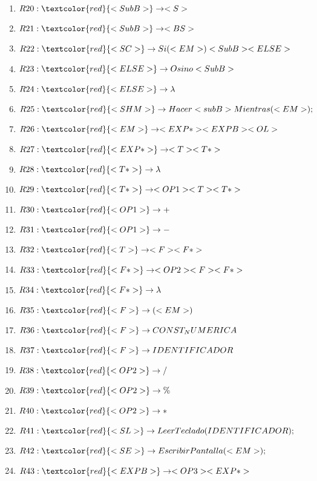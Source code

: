 \documentclass{article}
\begin{document}
\begin{enumerate}
\item $R20:   \textcolor{red}{ <SubB>}    \rightarrow   <S>$
\item $R21:   \textcolor{red}{ <SubB>   } \rightarrow   <BS>$
\item $R22:  \textcolor{red}{  <SC> }       \rightarrow   Si(<EM>)<SubB><ELSE>$
\item $R23:    \textcolor{red}{<ELSE>}    \rightarrow   Osino<SubB>$
\item $R24:    \textcolor{red}{<ELSE> }   \rightarrow   \lambda$
\item $R25:   \textcolor{red}{ <SHM> }   \rightarrow   Hacer<subB>Mientras(<EM>);$
\item $R26:    \textcolor{red}{<EM> }   \rightarrow   <EXP*><EXPB><OL>$
\item $R27:    \textcolor{red}{ <EXP*> }       \rightarrow   <T><T*>$
\item $R28:     \textcolor{red}{<T*>  }      \rightarrow   \lambda$
\item $R29:    \textcolor{red}{<T*>}        \rightarrow   <OP1><T><T*>$
\item $R30:    \textcolor{red}{ <OP1>  }      \rightarrow   + $
\item $R31:     \textcolor{red}{<OP1>   }     \rightarrow   - $
\item $R32:    \textcolor{red}{ <T>}        \rightarrow   <F><F*> $
\item $R33:     \textcolor{red}{<F*>}        \rightarrow   <OP2><F><F*> $
\item $R34:     \textcolor{red}{<F*> }       \rightarrow   \lambda $
\item $R35:     \textcolor{red}{<F>}        \rightarrow   (<EM>)  $ 
\item $R36:     \textcolor{red}{<F> }       \rightarrow   CONST_NUMERICA $ 
\item $R37:     \textcolor{red}{<F>    }    \rightarrow   IDENTIFICADOR $
\item $R38:     \textcolor{red}{<OP2>}        \rightarrow   / $
\item $R39:     \textcolor{red}{<OP2> }       \rightarrow   \% $
\item $R40:     \textcolor{red}{<OP2> }       \rightarrow   * $
\item $R41:    \textcolor{red}{ <SL>   }   \rightarrow   LeerTeclado(IDENTIFICADOR);$
\item $R42:     \textcolor{red}{<SE>}        \rightarrow   EscribirPantalla(<EM>); $
\item $R43:     \textcolor{red}{<EXPB>}        \rightarrow   <OP3><EXP*> $

\end{enumerate}
\end{document}
